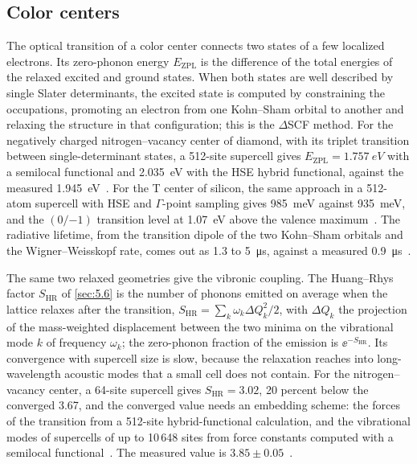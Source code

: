 \subsection{Color centers}

The optical transition of a color center connects two states of a few localized electrons. Its zero-phonon energy $E_{\mathrm{ZPL}}$ is the difference of the total energies of the relaxed excited and ground states. When both states are well described by single Slater determinants, the excited state is computed by constraining the occupations, promoting an electron from one Kohn--Sham orbital to another and relaxing the structure in that configuration; this is the $\Delta$SCF method. For the negatively charged nitrogen--vacancy center of diamond, with its triplet transition between single-determinant states, a 512-site supercell gives $E_{\mathrm{ZPL}} = \SI{1.757}{eV}$ with a semilocal functional and \SI{2.035}{eV} with the HSE hybrid functional, against the measured \SI{1.945}{eV}~\cite[Sect.~4.1]{alkauskas2014first}. For the T center of silicon, the same approach in a 512-atom supercell with HSE and $\Gamma$-point sampling gives \SI{985}{meV} against \SI{935}{meV}, and the $(0/{-1})$ transition level at \SI{1.07}{eV} above the valence maximum~\cite{dhaliah2022first}. The radiative lifetime, from the transition dipole of the two Kohn--Sham orbitals and the Wigner--Weisskopf rate, comes out as 1.3 to \SI{5}{\micro s}, against a measured \SI{0.9}{\micro s}~\cite{dhaliah2022first}.

The same two relaxed geometries give the vibronic coupling. The Huang--Rhys factor $S_{\mathrm{HR}}$ of \cref{sec:5.6} is the number of phonons emitted on average when the lattice relaxes after the transition, $S_{\mathrm{HR}} = \sum_k\omega_k\Delta Q_k^2/2$, with $\Delta Q_k$ the projection of the mass-weighted displacement between the two minima on the vibrational mode $k$ of frequency $\omega_k$; the zero-phonon fraction of the emission is $\ee^{-S_{\mathrm{HR}}}$. Its convergence with supercell size is slow, because the relaxation reaches into long-wavelength acoustic modes that a small cell does not contain. For the nitrogen--vacancy center, a 64-site supercell gives $S_{\mathrm{HR}} = 3.02$, 20 percent below the converged 3.67, and the converged value needs an embedding scheme: the forces of the transition from a 512-site hybrid-functional calculation, and the vibrational modes of supercells of up to 10\,648 sites from force constants computed with a semilocal functional~\cite[Sects.~2.3 and~4.2]{alkauskas2014first}. The measured value is $3.85 \pm 0.05$~\cite[Sect.~3]{alkauskas2014first}.

